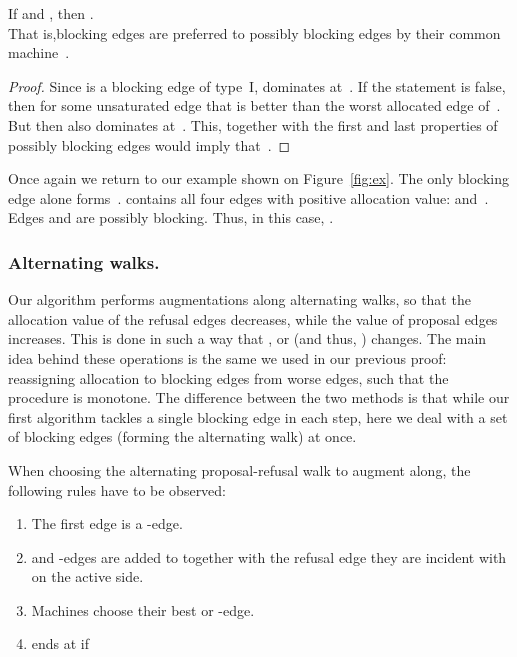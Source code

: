 \documentclass{llncs}
\begin{document}
\begin{lemma}
\label{p_good}
	If  and , then . \\That is,blocking edges are preferred to possibly blocking edges by their common machine~.
\end{lemma}

\begin{proof}
	Since  is a blocking edge of type~I,  dominates  at~. If the statement is false, then  for some unsaturated edge  that is better than the worst allocated edge of~. But then also  dominates  at~. This, together with the first and last properties of possibly blocking edges would imply that~.
\end{proof}

Once again we return to our example shown on Figure~\ref{fig:ex}. The only blocking edge  alone forms~.  contains all four edges with positive allocation value:  and~. Edges  and  are possibly blocking. Thus, in this case, .



\subsubsection*{Alternating walks.}

Our algorithm performs augmentations along alternating walks, so that the allocation value of the refusal edges decreases, while the value of proposal edges increases. This is done in such a way that ,  or  (and thus, ) changes. The main idea behind these operations is the same we used in our previous proof: reassigning allocation to blocking edges from worse edges, such that the procedure is monotone. The difference between the two methods is that while our first algorithm tackles a single blocking edge in each step, here we deal with a set of blocking edges (forming the alternating walk) at once. 

When choosing the alternating proposal-refusal walk  to augment along, the following rules have to be observed:
\begin{enumerate}
    \item The first edge  is a -edge.
    \item  and -edges are added to  together with the refusal edge they are incident with on the active side.
    \item\label{bestp} Machines choose their best  or -edge.
    \item\label{term}  ends at  if 
\end{enumerate}
\end{document}
